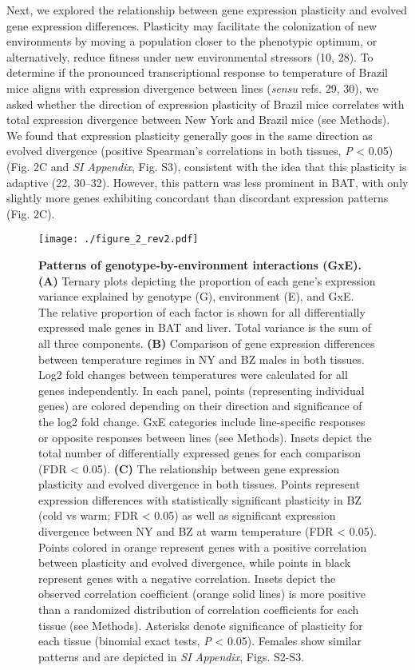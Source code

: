 \documentclass[9pt,twocolumn,twoside,lineno]{pnas-new}
\begin{document}
Next, we explored the relationship between gene expression plasticity
and evolved gene expression differences. Plasticity may facilitate the
colonization of new environments by moving a population closer to the
phenotypic optimum, or alternatively, reduce fitness under new
environmental stressors (10, 28). To determine if the pronounced
transcriptional response to temperature of Brazil mice aligns with
expression divergence between lines (\emph{sensu} refs. 29, 30), we
asked whether the direction of expression plasticity of Brazil mice
correlates with total expression divergence between New York and Brazil
mice (see Methods). We found that expression plasticity generally goes
in the same direction as evolved divergence (positive Spearman's
correlations in both tissues, \emph{P} \textless{} 0.05) (Fig. 2C and
\emph{SI Appendix}, Fig. S3), consistent with the idea that this
plasticity is adaptive (22, 30--32). However, this pattern was less
prominent in BAT, with only slightly more genes exhibiting concordant
than discordant expression patterns (Fig. 2C).

\begin{figure}[!t]
  \centering
  \texttt{[image: ./figure\_2\_rev2.pdf]}
  \caption{\textbf{Patterns of genotype-by-environment interactions (GxE). (A)} Ternary plots depicting the proportion of each gene’s expression variance explained by genotype (G), environment (E), and GxE. The relative proportion of each factor is shown for all differentially expressed male genes in BAT and liver. Total variance is the sum of all three components. \textbf{(B)} Comparison of gene expression differences between temperature regimes in NY and BZ males in both tissues. Log2 fold changes between temperatures were calculated for all genes independently. In each panel, points (representing individual genes) are colored depending on their direction and significance of the log2 fold change. GxE categories include line-specific responses or opposite responses between lines (see Methods). Insets depict the total number of differentially expressed genes for each comparison (FDR < 0.05). \textbf{(C)} The relationship between gene expression plasticity and evolved divergence in both tissues. Points represent expression differences with statistically significant plasticity in BZ (cold vs warm; FDR < 0.05) as well as significant expression divergence between NY and BZ at warm temperature (FDR < 0.05). Points colored in orange represent genes with a positive correlation between plasticity and evolved divergence, while points in black represent genes with a negative correlation. Insets depict the observed correlation coefficient (orange solid lines) is more positive than a randomized distribution of correlation coefficients for each tissue (see Methods). Asterisks denote significance of plasticity for each tissue (binomial exact tests, \textit{P} < 0.05). Females show similar patterns and are depicted in \textit{SI Appendix}, Figs. S2-S3.}
\end{figure}
\end{document}
